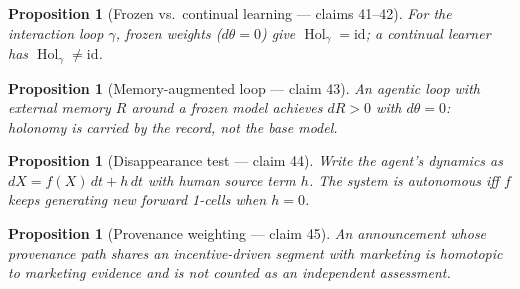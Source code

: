 \documentclass[11pt,a4paper]{article}
\newtheorem{proposition}[definition]{Proposition}
\begin{document}
\begin{proposition}[Frozen vs.\ continual learning --- claims 41--42]
For the interaction loop $\gamma$, frozen weights ($d\theta=0$) give
$\operatorname{Hol}_\gamma=\mathrm{id}$; a continual learner has
$\operatorname{Hol}_\gamma\neq\mathrm{id}$.
\end{proposition}

\begin{proposition}[Memory-augmented loop --- claim 43]
An agentic loop with external memory $R$ around a frozen model achieves
$dR>0$ with $d\theta=0$: holonomy is carried by the record, not the base model.
\end{proposition}

\begin{proposition}[Disappearance test --- claim 44]
Write the agent's dynamics as $dX=f(X)\,dt+h\,dt$ with human source term $h$.
The system is autonomous iff $f$ keeps generating new forward 1-cells when $h=0$.
\end{proposition}

\begin{proposition}[Provenance weighting --- claim 45]
An announcement whose provenance path shares an incentive-driven segment with
marketing is homotopic to marketing evidence and is not counted as an
independent assessment.
\end{proposition}
\end{document}
